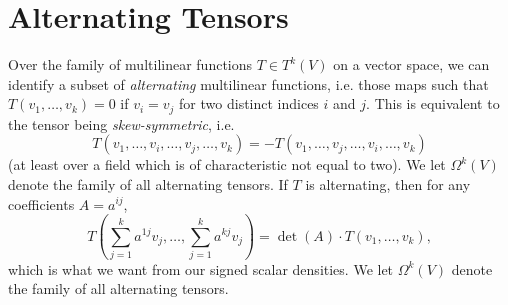 \begin{comment}

To begin with, we would like a formula which gives the area of a $k$ dimensional parallelogram spanned by $k$ vectors $v_1, \dots, v_k$ in $\RR^n$. This quantity is
%
\[ \det \left( v_i \cdot v_j \right)^{1/2} \]
%
To see why, we note that this quantity is clearly invariant under rotation, and since we would imagine rotations to preserve rotation, we may assume $v_1, \dots, v_k$ lie in the $k$ dimensional plane in $\RR^n$ spanned by $e_1, \dots, e_k$. If $v_i = w_i \times \{ 0 \}$ for $w_i \in \RR^k$, then
%
\[ \det \left( v_i \cdot v_j \right)^{1/2} = \det \left( w_i \cdot w_j \right)^{1/2} \]
%
That this right hand side is equal to what we would expect the usual volume to be, i.e. $\det(w_1, \dots, w_k)$, is obtained by noting that if $A$ is a $k \times k$ matrix whose $i$'th column is $w_i$, then $(A^T A)_{ij} = w_j \cdot w_i$, and so
%
\begin{align*}
    \det( w_i \cdot w_j) = \det( A^T A ) = \det(A)^2 = \det(w_1, \dots, w_k)^2.
\end{align*}
%
We will refer to the matrix $( v_i \cdot v_j )$ of $k$ vectors as the Grammian, denoted $G(v_1, \dots, v_k)$. Thus the area of the parallelogram spanned by these vectors is equal to $\det(G(v_1, \dots, v_k))^{1/2}$. We note that if $A$ is the matrix with columns $v_1, \dots, v_k$, then $(A^T A)_{ij} = v_i \cdot v_j$, so $G(v_1, \dots, v_k) = A^T A$. 

If $B$ is a $k \times k$ matrix, then $AB$ is a matrix whose $i$'th column is  are now a linear combination of the vectors $v_1, \dots, v_k$. We calculate that
%
\[ G(\sum v_1, \dots, Bv_k) = (BA)^T BA = A^T B^TB A, \]
%
and so $\det(G(Bv_1,\dots,Bv_k))^{1/2} = \det(A^T B^T B A)$.

\end{comment}

\section{Alternating Tensors}

Over the family of multilinear functions $T \in T^k(V)$ on a vector space, we can identify a subset of \emph{alternating} multilinear functions, i.e. those maps such that $T(v_1, \dots, v_k) = 0$ if $v_i = v_j$ for two distinct indices $i$ and $j$. This is equivalent to the tensor being \emph{skew-symmetric}, i.e.
%
\[ T(v_1, \dots, v_i, \dots, v_j, \dots, v_k) = - T(v_1, \dots, v_j, \dots, v_i, \dots, v_k) \]
%
(at least over a field which is of characteristic not equal to two). We let $\Omega^k(V)$ denote the family of all alternating tensors. If $T$ is alternating, then for any coefficients $A = a^{ij}$,
%
\[ T \left(\sum_{j = 1}^k a^{1j} v_j, \dots, \sum_{j = 1}^k a^{kj} v_j \right) = \det(A) \cdot T(v_1, \dots, v_k), \]
%
which is what we want from our signed scalar densities. We let $\Omega^k(V)$ denote the family of all alternating tensors.


